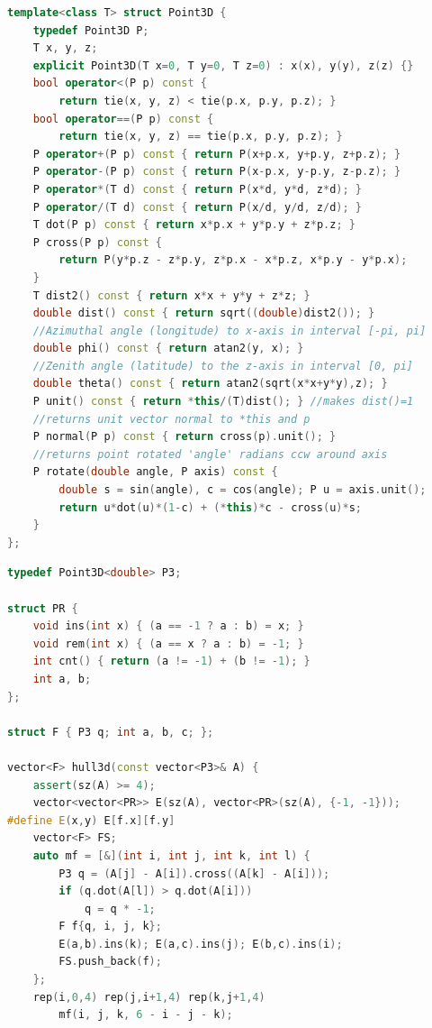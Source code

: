 \begin{multicols}{\Columns}
\begin{lstlisting}[language=C++]
template<class T> struct Point3D {
	typedef Point3D P;
	T x, y, z;
	explicit Point3D(T x=0, T y=0, T z=0) : x(x), y(y), z(z) {}
	bool operator<(P p) const {
		return tie(x, y, z) < tie(p.x, p.y, p.z); }
	bool operator==(P p) const {
		return tie(x, y, z) == tie(p.x, p.y, p.z); }
	P operator+(P p) const { return P(x+p.x, y+p.y, z+p.z); }
	P operator-(P p) const { return P(x-p.x, y-p.y, z-p.z); }
	P operator*(T d) const { return P(x*d, y*d, z*d); }
	P operator/(T d) const { return P(x/d, y/d, z/d); }
	T dot(P p) const { return x*p.x + y*p.y + z*p.z; }
	P cross(P p) const {
		return P(y*p.z - z*p.y, z*p.x - x*p.z, x*p.y - y*p.x);
	}
	T dist2() const { return x*x + y*y + z*z; }
	double dist() const { return sqrt((double)dist2()); }
	//Azimuthal angle (longitude) to x-axis in interval [-pi, pi]
	double phi() const { return atan2(y, x); }
	//Zenith angle (latitude) to the z-axis in interval [0, pi]
	double theta() const { return atan2(sqrt(x*x+y*y),z); }
	P unit() const { return *this/(T)dist(); } //makes dist()=1
	//returns unit vector normal to *this and p
	P normal(P p) const { return cross(p).unit(); }
	//returns point rotated 'angle' radians ccw around axis
	P rotate(double angle, P axis) const {
		double s = sin(angle), c = cos(angle); P u = axis.unit();
		return u*dot(u)*(1-c) + (*this)*c - cross(u)*s;
	}
};
\end{lstlisting}

\begin{lstlisting}[language=C++]
typedef Point3D<double> P3;

struct PR {
	void ins(int x) { (a == -1 ? a : b) = x; }
	void rem(int x) { (a == x ? a : b) = -1; }
	int cnt() { return (a != -1) + (b != -1); }
	int a, b;
};

struct F { P3 q; int a, b, c; };

vector<F> hull3d(const vector<P3>& A) {
	assert(sz(A) >= 4);
	vector<vector<PR>> E(sz(A), vector<PR>(sz(A), {-1, -1}));
#define E(x,y) E[f.x][f.y]
	vector<F> FS;
	auto mf = [&](int i, int j, int k, int l) {
		P3 q = (A[j] - A[i]).cross((A[k] - A[i]));
		if (q.dot(A[l]) > q.dot(A[i]))
			q = q * -1;
		F f{q, i, j, k};
		E(a,b).ins(k); E(a,c).ins(j); E(b,c).ins(i);
		FS.push_back(f);
	};
	rep(i,0,4) rep(j,i+1,4) rep(k,j+1,4)
		mf(i, j, k, 6 - i - j - k);


\end{lstlisting}
\end{multicols}
